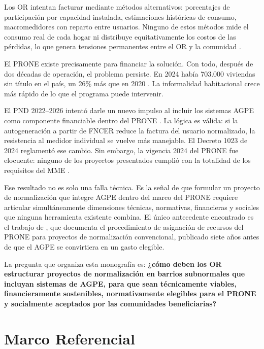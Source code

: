 Los OR intentan facturar mediante métodos alternativos: porcentajes de participación por capacidad instalada, estimaciones históricas de consumo, macromedidores con reparto entre usuarios. Ninguno de estos métodos mide el consumo real de cada hogar ni distribuye equitativamente los costos de las pérdidas, lo que genera tensiones permanentes entre el OR y la comunidad \parencite{DUR1073_2015, ReySerrato2009}.

El PRONE existe precisamente para financiar la solución. Con todo, después de dos décadas de operación, el problema persiste. En 2024 había 703.000 viviendas sin título en el país, un 26\% más que en 2020 \parencite{DANE2024a}. La informalidad habitacional crece más rápido de lo que el programa puede intervenir.

El PND 2022--2026 intentó darle un nuevo impulso al incluir los sistemas AGPE como componente financiable dentro del PRONE \parencite{Ley2294_2023}. La lógica es válida: si la autogeneración a partir de FNCER reduce la factura del usuario normalizado, la resistencia al medidor individual se vuelve más manejable. El Decreto 1023 de 2024 reglamentó ese cambio. Sin embargo, la vigencia 2024 del PRONE fue elocuente: ninguno de los proyectos presentados cumplió con la totalidad de los requisitos del MME \parencite{MME2025}.

Ese resultado no es solo una falla técnica. Es la señal de que formular un proyecto de normalización que integre AGPE dentro del marco del PRONE requiere articular simultáneamente dimensiones técnicas, normativas, financieras y sociales que ninguna herramienta existente combina. El único antecedente encontrado es el trabajo de \textcite{AriasArias2017}, que documenta el procedimiento de asignación de recursos del PRONE para proyectos de normalización convencional, publicado siete años antes de que el AGPE se convirtiera en un gasto elegible.

La pregunta que organiza esta monografía es: \textbf{¿cómo deben los OR estructurar proyectos de normalización en barrios subnormales que incluyan sistemas de AGPE, para que sean técnicamente viables, financieramente sostenibles, normativamente elegibles para el PRONE y socialmente aceptados por las comunidades beneficiarias?}


\section{Marco Referencial}
\label{sec:marco}


